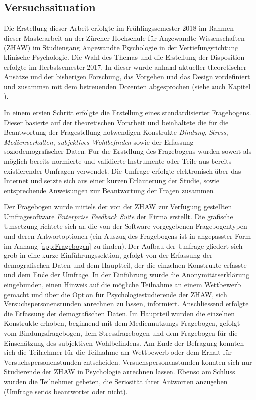 \subsection{Versuchssituation}\label{sec:Versuchssituation}
Die Erstellung dieser Arbeit erfolgte im Frühlingssemester 2018 im Rahmen dieser Masterarbeit an der Zürcher Hochschule für Angewandte Wissenschaften (ZHAW) im Studiengang Angewandte Psychologie in der Vertiefungsrichtung klinische Psychologie. Die Wahl des Themas und die Erstellung der Disposition erfolgte im Herbstsemester 2017. In dieser wurde anhand aktueller theoretischer Ansätze und der bisherigen Forschung, das Vorgehen und das Design vordefiniert und zusammen mit dem betreuenden Dozenten abgesprochen (siehe auch Kapitel \textit{}). 

In einem ersten Schritt erfolgte die Erstellung eines standardisierter Fragebogens. Dieser basierte auf der theoretischen Vorarbeit und beinhaltete die für die Beantwortung der Fragestellung notwendigen Konstrukte \textit{Bindung}, \textit{Stress}, \textit{Medienverhalten}, \textit{subjektives Wohlbefinden} sowie der Erfassung soziodemografischer Daten. Für die Erstellung des Fragebogens wurden soweit als möglich bereits normierte und validierte Instrumente oder Teile aus bereits existierender Umfragen verwendet. Die Umfrage erfolgte elektronisch über das Internet und setzte sich aus einer kurzen Erläuterung der Studie, sowie entsprechende Anweisungen zur Beantwortung der Fragen zusammen. 

Der Fragebogen wurde mittels der von der ZHAW zur Verfügung gestellten Umfragesoftware \textit{Enterprise Feedback Suite} der Firma  erstellt. Die grafische Umsetzung richtete sich an die von der Software vorgegebenen Fragebogentypen und deren Antwortoptionen (ein Auszug des Fragebogens ist in angepasster Form im Anhang \ref{app:Fragebogen} zu finden). Der Aufbau der Umfrage gliedert sich grob in eine kurze Einführungssektion, gefolgt von der Erfassung der demografischen Daten und dem Hauptteil, der die einzelnen Konstrukte erfasste und dem Ende der Umfrage. In der Einführung wurde die Anonymitätserklärung eingebunden, einen Hinweis auf die mögliche Teilnahme an einem  Wettbewerb gemacht und über die Option für Psychologiestudierende der ZHAW, sich Versuchspersonenstunden anrechnen zu lassen, informiert. Anschliessend erfolgte die Erfassung der demografischen Daten. Im Hauptteil wurden die einzelnen Konstrukte erhoben, beginnend mit dem Mediennutzungs-Fragebogen, gefolgt vom Bindungsfragebogen, dem Stressfragebogen und dem Fragebogen für die Einschätzung des subjektiven Wohlbefindens. Am Ende der Befragung konnten sich die Teilnehmer für die Teilnahme am Wettbewerb oder dem Erhalt für Versuchspersonenstunden entscheiden. Versuchspersonenstunden konnten sich nur Studierende der ZHAW in Psychologie anrechnen lassen. Ebenso am Schluss wurden die Teilnehmer gebeten, die Seriosität ihrer Antworten anzugeben (Umfrage seriös beantwortet oder nicht). 


